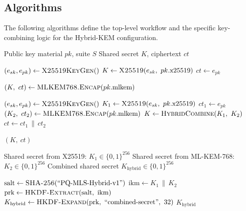 \documentclass{ieeeaccess}
\begin{document}
\subsection{Algorithms}
The following algorithms define the top-level workflow and the specific key-combining logic for the Hybrid-KEM configuration.
\begin{algorithm}[H]
\caption{KEM Encapsulation Dispatch}
\label{alg:kem}
\begin{algorithmic}[1]
\Require Public key material $pk$, suite $S$
\Ensure  Shared secret $K$, ciphertext $ct$

  \State $(e_{sk}, e_{pk}) \gets \textsc{X25519KeyGen}()$
  \State $K \gets \textsc{X25519}(e_{sk},\ pk.\text{x25519})$
  \State $ct \gets e_{pk}$

  \State $(K,\ ct) \gets \textsc{MLKEM768.Encap}(pk.\text{mlkem})$

  \State $(e_{sk}, e_{pk}) \gets \textsc{X25519KeyGen}()$
  \State $K_1 \gets \textsc{X25519}(e_{sk},\ pk.\text{x25519})$
  \State $ct_1 \gets e_{pk}$
  \State $(K_2,\ ct_2) \gets \textsc{MLKEM768.Encap}(pk.\text{mlkem})$
  \State $K \gets \textsc{HybridCombine}(K_1,\ K_2)$
  \State $ct \gets ct_1 \,\|\, ct_2$
\EndIf

\State \Return $(K,\ ct)$
\end{algorithmic}
\end{algorithm}

\begin{algorithm}[!t]
\caption{Hybrid-KEM Key Combiner}
\label{alg:combine}
\begin{algorithmic}[1]
\Require Shared secret from X25519: $K_1 \in \{0,1\}^{256}$
\Require Shared secret from ML-KEM-768: $K_2 \in \{0,1\}^{256}$
\Ensure  Combined shared secret $K_{\text{hybrid}} \in \{0,1\}^{256}$

\State $\text{salt} \gets \textsc{SHA-256}(\text{``PQ-MLS-Hybrid-v1''})$
\State $\text{ikm} \gets K_1 \,\|\, K_2$
\State $\text{prk} \gets \textsc{HKDF-Extract}(\text{salt},\ \text{ikm})$
\State $K_{\text{hybrid}} \gets \textsc{HKDF-Expand}(\text{prk},\ \text{``combined-secret''},\ 32)$
\State \Return $K_{\text{hybrid}}$

\medskip
{}
\end{algorithmic}
\end{algorithm}
\end{document}
